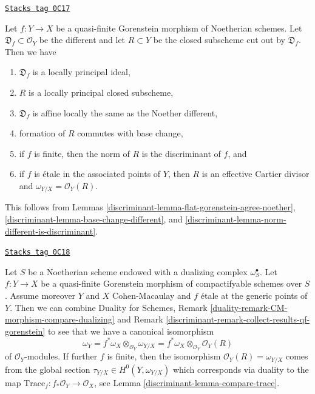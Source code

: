 \begin{remark}
\label{discriminant-remark-collect-results-qf-gorenstein}
\href{https://stacks.math.columbia.edu/tag/0C17}{\texttt{Stacks tag 0C17}}

Let $f : Y \to X$ be a quasi-finite Gorenstein morphism of Noetherian schemes.
Let $\mathfrak D_f \subset \mathcal{O}_Y$ be the different and let
$R \subset Y$ be the closed subscheme cut out by $\mathfrak D_f$.
Then we have
\begin{enumerate}
\item $\mathfrak D_f$ is a locally principal ideal,
\item $R$ is a locally principal closed subscheme,
\item $\mathfrak D_f$ is affine locally the same as the Noether different,
\item formation of $R$ commutes with base change,
\item if $f$ is finite, then the norm of $R$ is the discriminant of $f$, and
\item if $f$ is \'etale in the associated points of $Y$, then
$R$ is an effective Cartier divisor and $\omega_{Y/X} = \mathcal{O}_Y(R)$.
\end{enumerate}
This follows from Lemmas \ref{discriminant-lemma-flat-gorenstein-agree-noether},
\ref{discriminant-lemma-base-change-different}, and
\ref{discriminant-lemma-norm-different-is-discriminant}.
\end{remark}

\begin{remark}
\label{discriminant-remark-collect-results-qf-gorenstein-two}
\href{https://stacks.math.columbia.edu/tag/0C18}{\texttt{Stacks tag 0C18}}

Let $S$ be a Noetherian scheme endowed with a dualizing complex
$\omega_S^\bullet$. Let $f : Y \to X$ be a quasi-finite Gorenstein
morphism of compactifyable schemes over $S$. Assume moreover
$Y$ and $X$ Cohen-Macaulay and $f$ \'etale at the generic
points of $Y$. Then we can combine
Duality for Schemes, Remark
\ref{duality-remark-CM-morphism-compare-dualizing} and
Remark \ref{discriminant-remark-collect-results-qf-gorenstein}
to see that we have a canonical isomorphism
$$
\omega_Y = f^*\omega_X \otimes_{\mathcal{O}_Y} \omega_{Y/X} =
f^*\omega_X \otimes_{\mathcal{O}_Y} \mathcal{O}_Y(R)
$$
of $\mathcal{O}_Y$-modules. If further $f$ is finite,
then the isomorphism $\mathcal{O}_Y(R) = \omega_{Y/X}$ comes
from the global section $\tau_{Y/X} \in H^0(Y, \omega_{Y/X})$
which corresponds via duality to the map
$\text{Trace}_f : f_*\mathcal{O}_Y \to \mathcal{O}_X$, see
Lemma \ref{discriminant-lemma-compare-trace}.
\end{remark}



